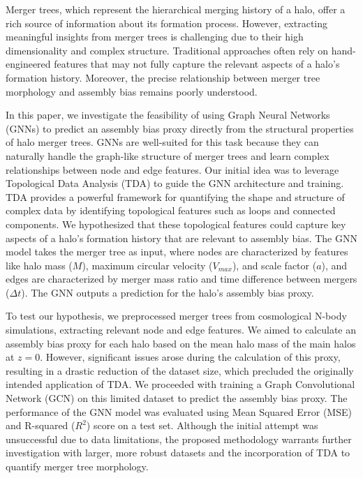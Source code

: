 \documentclass[twocolumn]{aastex631}
\begin{document}
Merger trees, which represent the hierarchical merging history of a halo, offer a rich source of information about its formation process. However, extracting meaningful insights from merger trees is challenging due to their high dimensionality and complex structure. Traditional approaches often rely on hand-engineered features that may not fully capture the relevant aspects of a halo's formation history. Moreover, the precise relationship between merger tree morphology and assembly bias remains poorly understood.

In this paper, we investigate the feasibility of using Graph Neural Networks (GNNs) to predict an assembly bias proxy directly from the structural properties of halo merger trees. GNNs are well-suited for this task because they can naturally handle the graph-like structure of merger trees and learn complex relationships between node and edge features. Our initial idea was to leverage Topological Data Analysis (TDA) to guide the GNN architecture and training. TDA provides a powerful framework for quantifying the shape and structure of complex data by identifying topological features such as loops and connected components. We hypothesized that these topological features could capture key aspects of a halo's formation history that are relevant to assembly bias. The GNN model takes the merger tree as input, where nodes are characterized by features like halo mass ($M$), maximum circular velocity ($V_{max}$), and scale factor ($a$), and edges are characterized by merger mass ratio and time difference between mergers ($\Delta t$). The GNN outputs a prediction for the halo's assembly bias proxy.

To test our hypothesis, we preprocessed merger trees from cosmological N-body simulations, extracting relevant node and edge features. We aimed to calculate an assembly bias proxy for each halo based on the mean halo mass of the main halos at $z=0$. However, significant issues arose during the calculation of this proxy, resulting in a drastic reduction of the dataset size, which precluded the originally intended application of TDA. We proceeded with training a Graph Convolutional Network (GCN) on this limited dataset to predict the assembly bias proxy. The performance of the GNN model was evaluated using Mean Squared Error (MSE) and R-squared ($R^2$) score on a test set. Although the initial attempt was unsuccessful due to data limitations, the proposed methodology warrants further investigation with larger, more robust datasets and the incorporation of TDA to quantify merger tree morphology.
\end{document}
